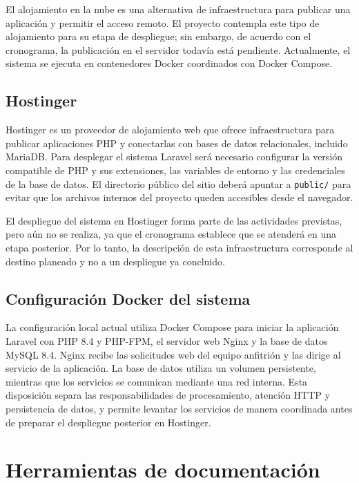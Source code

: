 El alojamiento en la nube es una alternativa de infraestructura para publicar una aplicación y permitir el acceso remoto. El proyecto contempla este tipo de alojamiento para su etapa de despliegue; sin embargo, de acuerdo con el cronograma, la publicación en el servidor todavía está pendiente. Actualmente, el sistema se ejecuta en contenedores Docker coordinados con Docker Compose.

\subsection{Hostinger}

Hostinger es un proveedor de alojamiento web que ofrece infraestructura para publicar aplicaciones PHP y conectarlas con bases de datos relacionales, incluido MariaDB. Para desplegar el sistema Laravel será necesario configurar la versión compatible de PHP y sus extensiones, las variables de entorno y las credenciales de la base de datos. El directorio público del sitio deberá apuntar a \texttt{public/} para evitar que los archivos internos del proyecto queden accesibles desde el navegador.

El despliegue del sistema en Hostinger forma parte de las actividades previstas, pero aún no se realiza, ya que el cronograma establece que se atenderá en una etapa posterior. Por lo tanto, la descripción de esta infraestructura corresponde al destino planeado y no a un despliegue ya concluido.

\subsection{Configuración Docker del sistema}

La configuración local actual utiliza Docker Compose para iniciar la aplicación Laravel con PHP 8.4 y PHP-FPM, el servidor web Nginx y la base de datos MySQL 8.4. Nginx recibe las solicitudes web del equipo anfitrión y las dirige al servicio de la aplicación. La base de datos utiliza un volumen persistente, mientras que los servicios se comunican mediante una red interna. Esta disposición separa las responsabilidades de procesamiento, atención HTTP y persistencia de datos, y permite levantar los servicios de manera coordinada antes de preparar el despliegue posterior en Hostinger.

\section{Herramientas de documentación}

